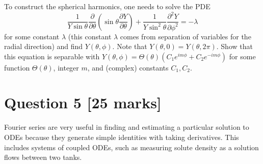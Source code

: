 \documentclass[12pt]{article}
\begin{document}
\medskip

To construct the spherical harmonics, one needs to solve the PDE
\[
\frac{1}{Y \sin \theta} \frac{\partial}{\partial \theta} \left( \sin \theta \frac{\partial Y}{\partial \theta} \right) + \frac{1}{Y \sin^2 \theta} \frac{\partial^2 Y}{\partial \phi^2} = -\lambda
\]
for some constant $\lambda$ (this constant $\lambda$ comes from separation of variables for the radial direction) and find $Y(\theta, \phi)$. Note that $Y(\theta, 0) = Y(\theta, 2\pi)$.
Show that this equation is separable with $Y(\theta, \phi) = \Theta(\theta) (C_1 e^{im\phi} + C_2 e^{-im\phi})$ for some function $\Theta(\theta)$, integer $m$, and (complex) constants $C_1, C_2$.


\clearpage

\section{\fontsize{14}{14}\selectfont Question 5 [25 marks]}

Fourier series are very useful in finding and estimating a particular solution to ODEs because they generate simple identities with taking derivatives. This includes systems of coupled ODEs, such as measuring solute density as a solution flows between two tanks.
\end{document}
